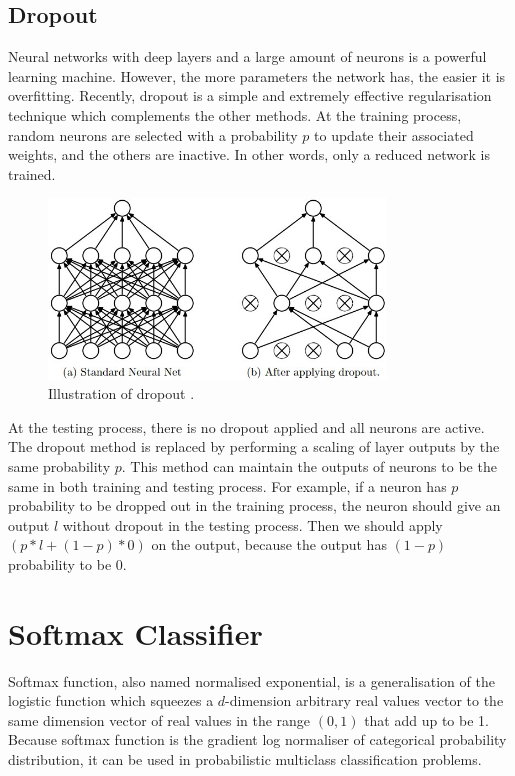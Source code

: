 \subsection{Dropout}

Neural networks with deep layers and a large amount of neurons is a powerful learning machine. However, the more parameters the network has, the easier it is overfitting. Recently, dropout \citep{srivastava2014dropout} is a simple and extremely effective regularisation technique which complements the other methods. At the training process, random neurons are selected with a probability $p$ to update their associated weights, and the others are inactive. In other words, only a reduced network is trained.
\graphicspath{ {./Figures/} }
\begin{figure}[!htb]
\centering
\includegraphics[width=0.8\textwidth]{dropout.jpeg}
\caption{\label{fig:Dropout}Illustration of dropout \citep{srivastava2014dropout}.}
\end{figure}
At the testing process, there is no dropout applied and all neurons are active. The dropout method is replaced by performing a scaling of layer outputs by the same probability $p$. This method can maintain the outputs of neurons to be the same in both training and testing process. For example, if a neuron has $p$ probability to be dropped out in the training process, the neuron should give an output $l$ without dropout in the testing process. Then we should apply $(p\ast l + (1 - p)\ast 0)$ on the output, because the output has $(1-p)$ probability to be $0$.

\section{Softmax Classifier}

Softmax function, also named normalised exponential, is a generalisation of the logistic function which squeezes a $d$-dimension arbitrary real values vector to the same dimension vector of real values in the range $(0,1)$ that add up to be 1. Because softmax function is the gradient log normaliser of categorical probability distribution, it can be used in probabilistic multiclass classification problems.


